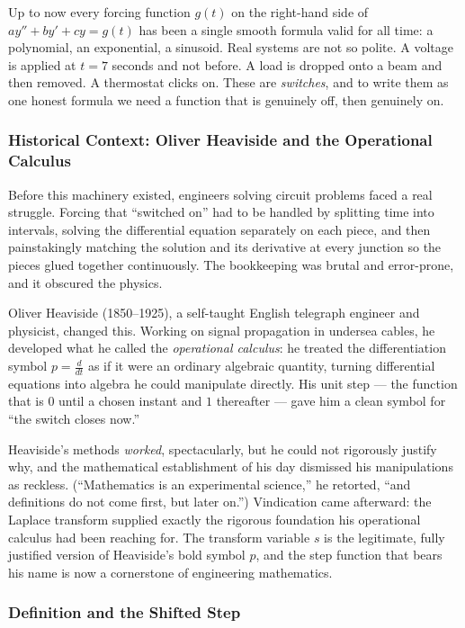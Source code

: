 \documentclass[11pt]{article}
\begin{document}
Up to now every forcing function $g(t)$ on the right-hand side of $a y'' + b y' + c y = g(t)$ has been a single smooth formula valid for all time: a polynomial, an exponential, a sinusoid. Real systems are not so polite. A voltage is applied at $t = 7$ seconds and not before. A load is dropped onto a beam and then removed. A thermostat clicks on. These are \emph{switches}, and to write them as one honest formula we need a function that is genuinely off, then genuinely on.

\subsubsection*{Historical Context: Oliver Heaviside and the Operational Calculus}

Before this machinery existed, engineers solving circuit problems faced a real struggle. Forcing that ``switched on'' had to be handled by splitting time into intervals, solving the differential equation separately on each piece, and then painstakingly matching the solution and its derivative at every junction so the pieces glued together continuously. The bookkeeping was brutal and error-prone, and it obscured the physics.

Oliver Heaviside (1850--1925), a self-taught English telegraph engineer and physicist, changed this. Working on signal propagation in undersea cables, he developed what he called the \emph{operational calculus}: he treated the differentiation symbol $p = \frac{d}{dt}$ as if it were an ordinary algebraic quantity, turning differential equations into algebra he could manipulate directly. His unit step --- the function that is $0$ until a chosen instant and $1$ thereafter --- gave him a clean symbol for ``the switch closes now.''

Heaviside's methods \emph{worked}, spectacularly, but he could not rigorously justify why, and the mathematical establishment of his day dismissed his manipulations as reckless. (``Mathematics is an experimental science,'' he retorted, ``and definitions do not come first, but later on.'') Vindication came afterward: the Laplace transform supplied exactly the rigorous foundation his operational calculus had been reaching for. The transform variable $s$ is the legitimate, fully justified version of Heaviside's bold symbol $p$, and the step function that bears his name is now a cornerstone of engineering mathematics.

\subsubsection*{Definition and the Shifted Step}
\end{document}
